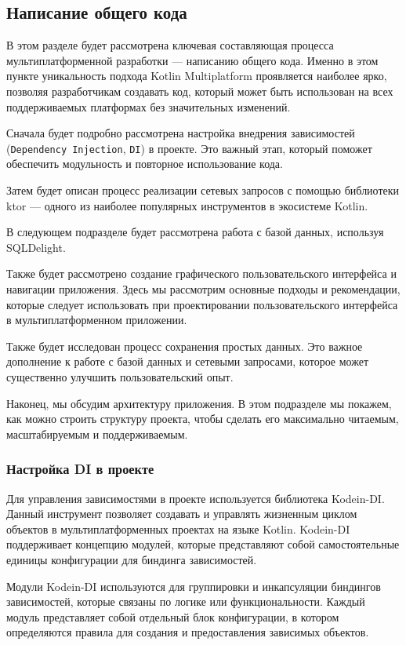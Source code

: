 \documentclass[14pt, russian]{scrartcl}
\begin{document}
\subsection{Написание общего кода}\label{sect:common}

В этом разделе будет рассмотрена ключевая составляющая процесса мультиплатформенной разработки --- написанию общего кода. Именно в этом пункте уникальность подхода Kotlin Multiplatform проявляется наиболее ярко, позволяя разработчикам создавать код, который может быть использован на всех поддерживаемых платформах без значительных изменений.

Сначала будет подробно рассмотрена настройка внедрения зависимостей (\texttt{Dependency Injection}, \texttt{DI}) в проекте. Это важный этап, который поможет обеспечить модульность и повторное использование кода.

Затем будет описан процесс реализации сетевых запросов с помощью библиотеки ktor — одного из наиболее популярных инструментов в экосистеме Kotlin.

В следующем подразделе будет рассмотрена работа с базой данных, используя SQLDelight.

Также будет рассмотрено создание графического пользовательского интерфейса и навигации приложения. Здесь мы рассмотрим основные подходы и рекомендации, которые следует использовать при проектировании пользовательского интерфейса в мультиплатформенном приложении.

Также будет исследован процесс сохранения простых данных. Это важное дополнение к работе с базой данных и сетевыми запросами, которое может существенно улучшить пользовательский опыт.

Наконец, мы обсудим архитектуру приложения. В этом подразделе мы покажем, как можно строить структуру проекта, чтобы сделать его максимально читаемым, масштабируемым и поддерживаемым.

\subsubsection{Настройка DI в проекте}

Для управления зависимостями в проекте используется библиотека Kodein-DI. Данный инструмент позволяет создавать и управлять жизненным циклом объектов в мультиплатформенных проектах на языке Kotlin. Kodein-DI поддерживает концепцию модулей, которые представляют собой самостоятельные единицы конфигурации для биндинга зависимостей.

Модули Kodein-DI используются для группировки и инкапсуляции биндингов зависимостей, которые связаны по логике или функциональности. Каждый модуль представляет собой отдельный блок конфигурации, в котором определяются правила для создания и предоставления зависимых объектов.
\end{document}
